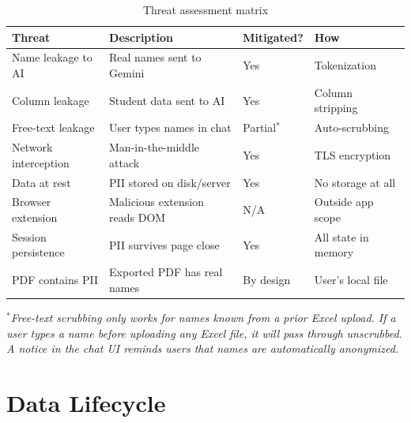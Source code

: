 \documentclass[11pt,letterpaper]{article}
\begin{document}
\begin{table}[h]
\centering
\begin{tabularx}{\textwidth}{lXll}
\toprule
\textbf{Threat} & \textbf{Description} & \textbf{Mitigated?} & \textbf{How} \\
\midrule
Name leakage to AI & Real names sent to Gemini & Yes & Tokenization \\
Column leakage & Student data sent to AI & Yes & Column stripping \\
Free-text leakage & User types names in chat & Partial$^*$ & Auto-scrubbing \\
Network interception & Man-in-the-middle attack & Yes & TLS encryption \\
Data at rest & PII stored on disk/server & Yes & No storage at all \\
Browser extension & Malicious extension reads DOM & N/A & Outside app scope \\
Session persistence & PII survives page close & Yes & All state in memory \\
PDF contains PII & Exported PDF has real names & By design & User's local file \\
\bottomrule
\end{tabularx}
\caption{Threat assessment matrix}
\end{table}

\label{sec:residual}
$^*$\textit{Free-text scrubbing only works for names known from a prior Excel upload. If a user types a name before uploading any Excel file, it will pass through unscrubbed. A notice in the chat UI reminds users that names are automatically anonymized.}

\section{Data Lifecycle}
\end{document}
